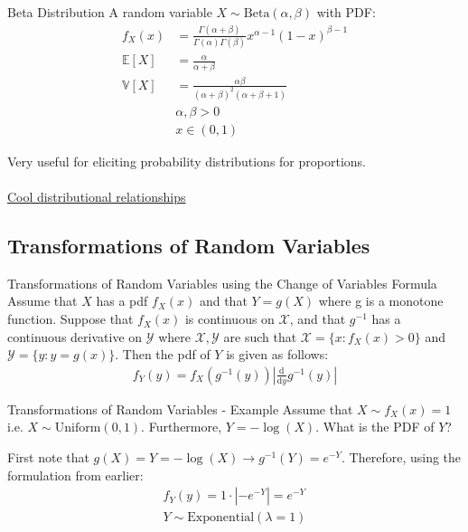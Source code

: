 \documentclass{beamer}
\begin{document}
\begin{frame}{Beta Distribution}
A random variable $X\sim\mathrm{Beta}(\alpha, \beta)$ with PDF:
\begin{align*}
f_{X}(x) &= \frac{\Gamma(\alpha + \beta)}{\Gamma(\alpha)\Gamma(\beta)}x^{\alpha-1}(1-x)^{\beta - 1} \\
\mathbb{E}[X] &= \frac{\alpha}{\alpha + \beta} \\
\mathbb{V}[X] &= \frac{\alpha \beta}{(\alpha + \beta)^{2}(\alpha + \beta + 1)} \\
&\alpha, \beta > 0 \\
&x \in (0, 1)
\end{align*} 

Very useful for eliciting probability distributions for proportions.\\~\\

\href{https://en.wikipedia.org/wiki/Relationships_among_probability_distributions}{Cool distributional relationships}
\end{frame}

\subsection{Transformations of Random Variables}
\begin{frame}{Transformations of Random Variables using the Change of Variables Formula}
Assume that $X$ has a pdf $f_{X}(x)$ and that $Y = g(X)$ where g is a monotone function. Suppose that  $f_{X}(x)$ is continuous on $\mathcal{X}$, and that $g^{-1}$ has a continuous derivative on $\mathcal{Y}$ where $\mathcal{X}, \mathcal{Y}$ are such that $\mathcal{X} = \{x: f_{X}(x) > 0\}$ and $\mathcal{Y} = \{y: y = g(x)\}$. Then the pdf of $Y$ is given as follows:
\begin{align*}
f_{Y}(y) = f_{X}(g^{-1}(y))|\frac{\mathrm{d}}{\mathrm{d}y}g^{-1}(y)|
\end{align*}
\end{frame}
 
\begin{frame}{Transformations of Random Variables - Example}
Assume that $X\sim f_{X}(x) = 1$ i.e. $X\sim\mathrm{Uniform}(0, 1)$. Furthermore, $Y = -\log(X)$. What is the PDF of $Y$?
\newline 

First note that $g(X)  = Y  = -\log (X) \rightarrow g^{-1}(Y) = e^{-Y}$. Therefore, using the formulation from earlier:
\begin{align*}
f_{Y}(y) = 1 \cdot |-e^{-Y}| = e^{-Y} \\
Y \sim \mathrm{Exponential}(\lambda = 1)
\end{align*}
\end{frame}
\end{document}
